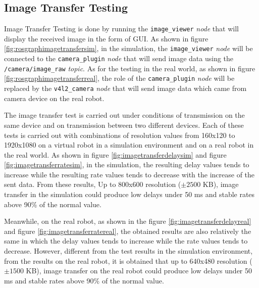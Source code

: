 \subsection{Image Transfer Testing}
\label{subsec:imagetransfertesting}




Image Transfer Testing is done by running the \lstinline{image_viewer} \emph{node} that will display the received image in the form of GUI.
As shown in figure \ref{fig:rosgraphimagetransfersim},
  in the simulation,
  the \lstinline{image_viewer} \emph{node} will be connected to the \lstinline{camera_plugin} \emph{node} that will send image data using the \lstinline{/camera/image_raw} \emph{topic}.
As for the testing in the real world,
  as shown in figure \ref{fig:rosgraphimagetransferreal},
  the role of the \lstinline{camera_plugin} \emph{node} will be replaced by the \lstinline{v4l2_camera} \emph{node} that will send image data which came from camera device on the real robot.




The image transfer test is carried out under conditions of transmission on the same device and on transmission between two different devices.
Each of these tests is carried out with combinations of resolution values from 160x120 to 1920x1080 on a virtual robot in a simulation environment and on a real robot in the real world.
As shown in figure \ref{fig:imagetransferdelaysim} and figure \ref{fig:imagetransferratesim},
  in the simulation,
  the resulting delay values tends to increase while the resulting rate values tends to decrease with the increase of the sent data.
From these results,
  Up to 800x600 resolution ($\pm2500$ KB),
  image transfer in the simulation could produce low delays under 50 ms and stable rates above 90\% of the normal value.




Meanwhile,
  on the real robot,
  as shown in the figure \ref{fig:imagetransferdelayreal} and figure \ref{fig:imagetransferratereal},
  the obtained results are also relatively the same in which the delay values tends to increase while the rate values tends to decrease.
However,
  different from the test results in the simulation environment,
  from the results on the real robot,
  it is obtained that up to 640x480 resolution ($\pm1500$ KB),
  image transfer on the real robot could produce low delays under 50 ms and stable rates above 90\% of the normal value.
